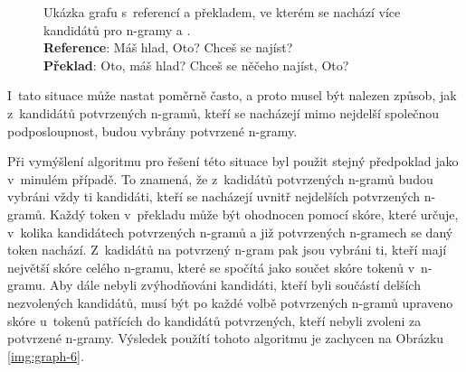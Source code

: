 \begin{figure}[h!]

	\caption{
		Ukázka grafu s~referencí a překladem, ve kterém se nachází více kandidátů pro \mbox{n-gramy}  a \uv{,}. \\
		\textbf{Reference}: Máš hlad, Oto? Chceš se najíst?\\
		\textbf{Překlad}: Oto, máš hlad? Chceš se něčeho najíst, Oto?
	}
	\label{img:graph-5}
\end{figure}

I~tato situace může nastat poměrně často,
  a proto musel být nalezen způsob,
  jak z~kandidátů potvrzených \mbox{n-gramů},
  kteří se nacházejí mimo nejdelší společnou podposloupnost,
  budou vybrány potvrzené \mbox{n-gramy}. 


Při vymýšlení algoritmu pro řešení této situace byl použit stejný předpoklad jako v~minulém případě.
To znamená, že z~kadidátů potvrzených \mbox{n-gramů} budou vybráni vždy ti kandidáti,
  kteří se nacházejí uvnitř nejdelších potvrzených \mbox{n-gramů}.
Každý token v~překladu může být ohodnocen pomocí skóre,
  které určuje, v~kolika kandidátech potvrzených \mbox{n-gramů} a již potvrzených \mbox{n-gramech} se daný token nachází.
Z~kadidátů na potvrzený \mbox{n-gram} pak jsou vybráni ti,
  kteří mají největší skóre celého \mbox{n-gramu},
  které se spočítá jako součet skóre tokenů v~\mbox{n-gramu}.
Aby dále nebyli zvýhodňováni kandidáti,
  kteří byli součástí delších nezvolených kandidátů,
  musí být po každé volbě potvrzených \mbox{n-gramů} upraveno skóre u~tokenů patřících do kandidátů potvrzených,
  kteří nebyli zvoleni za potvrzené \mbox{n-gramy}.
Výsledek použítí tohoto algoritmu je zachycen na Obrázku \ref{img:graph-6}.

